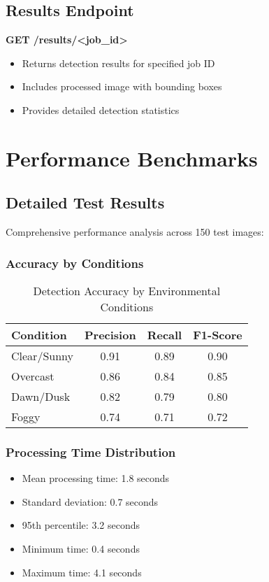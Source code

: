 \documentclass[12pt,a4paper]{report}
\begin{document}
\section{Results Endpoint}
\textbf{GET /results/<job\_id>}
\begin{itemize}
    \item Returns detection results for specified job ID
    \item Includes processed image with bounding boxes
    \item Provides detailed detection statistics
\end{itemize}

\chapter{Performance Benchmarks}

\section{Detailed Test Results}
Comprehensive performance analysis across 150 test images:

\subsection{Accuracy by Conditions}
\begin{table}[H]
\centering
\caption{Detection Accuracy by Environmental Conditions}
\begin{tabular}{@{}lccc@{}}
\toprule
Condition & Precision & Recall & F1-Score \\
\midrule
Clear/Sunny & 0.91 & 0.89 & 0.90 \\
Overcast & 0.86 & 0.84 & 0.85 \\
Dawn/Dusk & 0.82 & 0.79 & 0.80 \\
Foggy & 0.74 & 0.71 & 0.72 \\
\bottomrule
\end{tabular}
\end{table}

\subsection{Processing Time Distribution}
\begin{itemize}
    \item Mean processing time: 1.8 seconds
    \item Standard deviation: 0.7 seconds
    \item 95th percentile: 3.2 seconds
    \item Minimum time: 0.4 seconds
    \item Maximum time: 4.1 seconds
\end{itemize}
\end{document}

